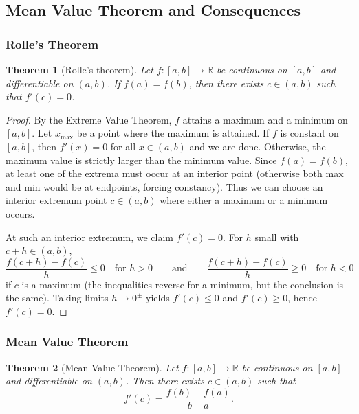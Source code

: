 \documentclass[12pt]{article}
\numberwithin{equation}{section}
\newcommand{\RR}{\mathbb{R}}
\theoremstyle{plain}
\newtheorem{theorem}{Theorem}[section]
\theoremstyle{definition}
\theoremstyle{remark}
\begin{document}
\newpage

\subsection{Mean Value Theorem and Consequences}

\subsubsection{Rolle's Theorem}

\begin{theorem}[Rolle's theorem]\label{thm:rolle}
Let $f:[a,b]\to\RR$ be continuous on $[a,b]$ and differentiable on $(a,b)$.
If $f(a)=f(b)$, then there exists $c\in(a,b)$ such that $f'(c)=0$.
\end{theorem}

\begin{proof}
By the Extreme Value Theorem, $f$ attains a maximum and a minimum on $[a,b]$.
Let $x_{\max}$ be a point where the maximum is attained.
If $f$ is constant on $[a,b]$, then $f'(x)=0$ for all $x\in(a,b)$ and we are done.
Otherwise, the maximum value is strictly larger than the minimum value.
Since $f(a)=f(b)$, at least one of the extrema must occur at an interior point (otherwise both max and min would be at endpoints, forcing constancy).
Thus we can choose an interior extremum point $c\in(a,b)$ where either a maximum or a minimum occurs.

At such an interior extremum, we claim $f'(c)=0$.
For $h$ small with $c+h\in(a,b)$,
\[
\frac{f(c+h)-f(c)}{h}\le 0 \quad \text{for } h>0
\qquad\text{and}\qquad
\frac{f(c+h)-f(c)}{h}\ge 0 \quad \text{for } h<0
\]
if $c$ is a maximum (the inequalities reverse for a minimum, but the conclusion is the same).
Taking limits $h\to 0^\pm$ yields $f'(c)\le 0$ and $f'(c)\ge 0$, hence $f'(c)=0$.
\end{proof}

\subsubsection{Mean Value Theorem}

\begin{theorem}[Mean Value Theorem]\label{thm:mvt}
Let $f:[a,b]\to\RR$ be continuous on $[a,b]$ and differentiable on $(a,b)$.
Then there exists $c\in(a,b)$ such that
\[
f'(c)=\frac{f(b)-f(a)}{b-a}.
\]
\end{theorem}
\end{document}
